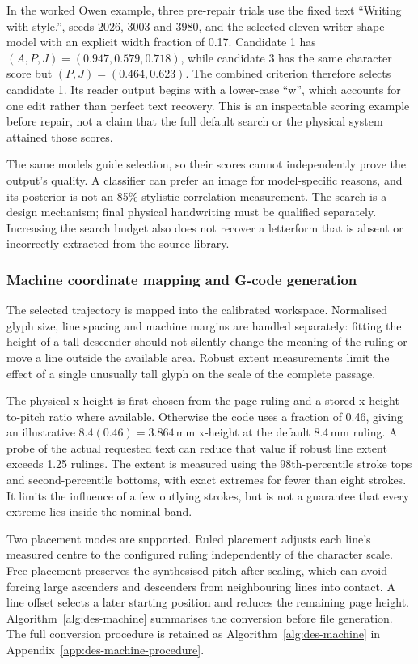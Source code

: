 In the worked Owen example, three pre-repair trials use the fixed text ``Writing with style.'', seeds 2026, 3003 and 3980, and the selected eleven-writer shape model with an explicit width fraction of 0.17. Candidate 1 has $(A,P,J)=(0.947,0.579,0.718)$, while candidate 3 has the same character score but $(P,J)=(0.464,0.623)$. The combined criterion therefore selects candidate 1. Its reader output begins with a lower-case ``w'', which accounts for one edit rather than perfect text recovery. This is an inspectable scoring example before repair, not a claim that the full default search or the physical system attained those scores.

The same models guide selection, so their scores cannot independently prove the output's quality. A classifier can prefer an image for model-specific reasons, and its posterior is not an 85\% stylistic correlation measurement. The search is a design mechanism; final physical handwriting must be qualified separately. Increasing the search budget also does not recover a letterform that is absent or incorrectly extracted from the source library.

\subsubsection{Machine coordinate mapping and G-code generation}
\label{sec:des-gcode}
The selected trajectory is mapped into the calibrated workspace. Normalised glyph size, line spacing and machine margins are handled separately: fitting the height of a tall descender should not silently change the meaning of the ruling or move a line outside the available area. Robust extent measurements limit the effect of a single unusually tall glyph on the scale of the complete passage.


The physical x-height is first chosen from the page ruling and a stored x-height-to-pitch ratio where available. Otherwise the code uses a fraction of 0.46, giving an illustrative $8.4(0.46)=3.864$\,mm x-height at the default 8.4\,mm ruling. A probe of the actual requested text can reduce that value if robust line extent exceeds 1.25 rulings. The extent is measured using the 98th-percentile stroke tops and second-percentile bottoms, with exact extremes for fewer than eight strokes. It limits the influence of a few outlying strokes, but is not a guarantee that every extreme lies inside the nominal band.

Two placement modes are supported. Ruled placement adjusts each line's measured centre to the configured ruling independently of the character scale. Free placement preserves the synthesised pitch after scaling, which can avoid forcing large ascenders and descenders from neighbouring lines into contact. A line offset selects a later starting position and reduces the remaining page height. Algorithm~\ref{alg:des-machine} summarises the conversion before file generation.
The full conversion procedure is retained as Algorithm~\ref{alg:des-machine} in Appendix~\ref{app:des-machine-procedure}.



